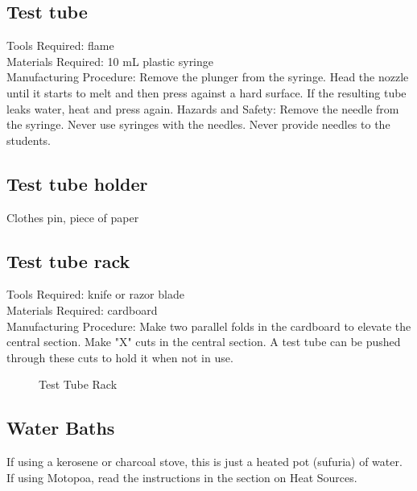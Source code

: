 \subsection*{Test tube}
Tools Required: flame\\
Materials Required: 10 mL plastic syringe\\
Manufacturing Procedure: Remove the plunger from the syringe. Head the nozzle until it starts to melt and then press against a hard surface. If the resulting tube leaks water, heat and press again.
Hazards and Safety: Remove the needle from the syringe. Never use syringes with the needles. Never provide needles to the students.

\subsection*{Test tube holder}
Clothes pin, piece of paper

\subsection*{Test tube rack}
Tools Required: knife or razor blade\\
Materials Required: cardboard\\
Manufacturing Procedure: Make two parallel folds in the cardboard to elevate the central section. Make "X" cuts in the central section. A test tube can be pushed through these cuts to hold it when not in use.

\begin{figure}[h]
\begin{center}
\def\svgwidth{150pt}

\caption{Test Tube Rack}
\end{center}
\end{figure}

\subsection*{Water Baths}
If using a kerosene or charcoal stove, this is just a heated pot (sufuria) of water. If using Motopoa, read the instructions in the section on Heat Sources.